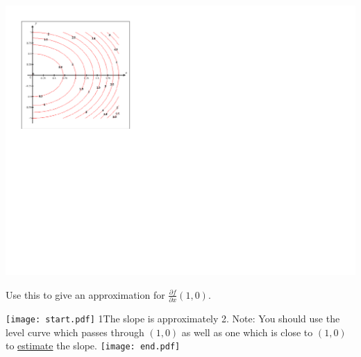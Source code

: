 \documentclass[12pt]{article}
\begin{document}
\begin{enumerate}
\begin{center}
\includegraphics[scale=1]{contour.pdf}
\end{center}

Use this to give an approximation for $\frac{\partial f}{\partial x}(1,0)$.

\texttt{[image: start.pdf]}
{{{1\linewidth}{The slope is approximately 2.  Note: You should use the level curve which passes through $(1,0)$ as well as one which is close to $(1,0)$ to \underline{estimate} the slope.}}}
\texttt{[image: end.pdf]}


\end{enumerate}
\end{document}
